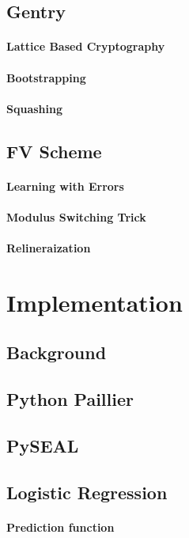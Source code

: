 \documentclass[10pt, a4paper]{article}
\begin{document}
	\subsection{Gentry}
	\paragraph{Lattice Based Cryptography}
	\paragraph{Bootstrapping}
	\paragraph{Squashing}
	
	\subsection{FV Scheme}
	\paragraph{Learning with Errors}
	\paragraph{Modulus Switching Trick}
	\paragraph{Relineraization}
	
	\section{Implementation}
	\subsection{Background}
	\subsection{Python Paillier}
	\subsection{PySEAL}
	\subsection{Logistic Regression}
	\paragraph{Prediction function}
\end{document}
